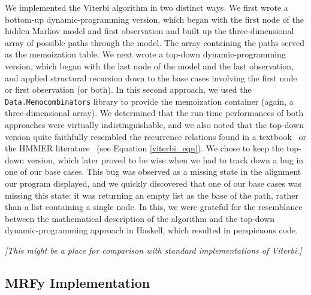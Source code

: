\documentclass[preprint,nonatbib,blockstyle,nocopyrightspace,times]{sigplanconf}
\let\cite\citep
\begin{document}
We implemented the Viterbi algorithm in two distinct ways.
We first wrote a 
bottom-up dynamic-programming version, which began with the first node of the 
hidden Markov model and first observation and built up the three-dimensional 
array of possible paths through the model.
The array containing the paths 
served as the memoization table.
We next wrote a top-down dynamic-programming 
version, which began with the last node of the model and the last observation, 
and applied structural recursion down to the base cases involving the first 
node or first observation (or both).
In this second approach, we used the 
\texttt{Data.Memocombinators} library to provide the memoization container 
(again, a three-dimensional array).
We determined that the run-time 
performances of both approaches were virtually indistinguishable, and we also 
noted that the top-down version quite faithfully resembled the recurrence 
relations found in a textbook~\cite{durbin} or the HMMER literature~\cite{eddy} 
(see Equation \ref{viterbi_eqn}).
We chose to keep the top-down version, which 
later proved to be wise when we had to track down a bug in one of our base 
cases.
This bug was observed as a missing state in the alignment our program 
displayed, and we quickly discovered that one of our base cases was missing 
this state: it was returning an empty list as the base of the path, rather than 
a list containing a single node.
In this, we were grateful for the resemblance 
between the mathematical description of the algorithm and the top-down 
dynamic-programming approach in Haskell, which resulted in perspicuous code.

\begin{figure}

\end{figure}


\emph{[This might be a place for comparison with standard
implementations of Viterbi.]}



\subsection{MRFy Implementation}
\end{document}

